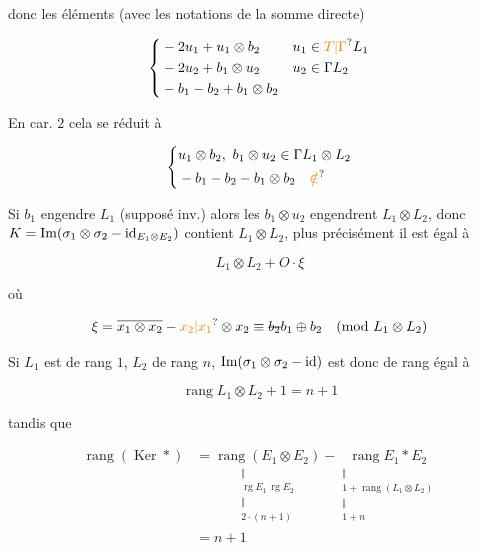 donc les éléments (avec les notations de la somme directe)

\[ \left\{\begin{aligned}&-2u_1+u_1\otimes b_2 &&u_1\in\unsure{T|\Gamma} L_1\\ &-2u_2+b_1\otimes u_2 &&u_2\in\Gamma L_2\\ &-b_1-b_2+b_1\otimes b_2\end{aligned}\right. \]

En car. $2$ cela se réduit à

\[ \left\{\begin{aligned}&u_1\otimes b_2,\ b_1\otimes u_2\in\Gamma L_1\otimes L_2\\ &-b_1-b_2-b_1\otimes b_2\quad\unsure{\notin}\end{aligned}\right. \]


Si $b_1$  engendre $L_1$ (supposé inv.) alors les $b_1\otimes u_2$ engendrent $L_1\otimes L_2$, donc  $K=\operatorname{Im}(\sigma_1\otimes\sigma_2-{\rm id}_{E_1\otimes E_2})$ contient $L_1\otimes L_2$, plus précisément il est égal à

\[ L_1\otimes L_2+O\cdot\xi \]

où

\[ \xi=\overline{x_1\otimes x_2}-\unsure{x_2|x_1}\otimes x_2\equiv\deleted{b_2}b_1\oplus b_2\quad(\text{mod }L_1\otimes L_2) \]


Si $L_1$ est de rang $1$, $L_2$ de rang $n$, $\operatorname{Im}(\sigma_1\otimes\sigma_2-{\rm id})$ est donc de rang  égal à

\[ \operatorname{rang} L_1\otimes L_2+1=n+1 \]

tandis que

\[ \begin{aligned}\operatorname{rang}(\operatorname{Ker} *)&=\underset{\substack{\Vert\\\operatorname{rg} E_1\,\operatorname{rg} E_2\\\Vert\\2\cdot(n+1)}}{\operatorname{rang}(E_1\otimes E_2)}-\underset{\substack{\Vert\\1+\operatorname{rang}(L_1\otimes L_2)\\\Vert\\1+n}}{\operatorname{rang} E_1*E_2}\\ &=n+1\end{aligned} \]

